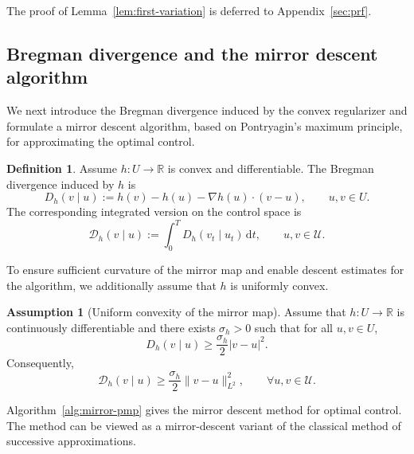 \documentclass[11pt]{amsart}
\theoremstyle{plain}
\theoremstyle{definition}
\newtheorem{defn}[theorem]{Definition}
\newtheorem{assump}{Assumption}
\theoremstyle{remark}
\newcommand{\dd}{\,\mathrm{d}}
\begin{document}
The proof of Lemma~\ref{lem:first-variation} is deferred to Appendix~\ref{sec:prf}.

\subsection{Bregman divergence and the mirror descent algorithm}\label{sec:div_alg}

We next introduce the Bregman divergence induced by the convex regularizer and formulate a mirror descent algorithm, based on Pontryagin's maximum principle, for approximating the optimal control.

\begin{defn}
Assume $h:U\to\mathbb R$ is convex and differentiable. The Bregman divergence induced by $h$ is
\begin{equation}\label{eq:bregman-pointwise}
D_h(v\mid u)
:=
h(v)-h(u)-\nabla h(u)\cdot (v-u),
\qquad u,v\in U.
\end{equation}
The corresponding integrated version on the control space is
\begin{equation}\label{eq:bregman-path}
\mathcal{D}_h(v\mid u)
:=
\int_0^T D_h(v_t\mid u_t)\dd t, \qquad u, v \in \mathcal{U}.
\end{equation}
\end{defn}

To ensure sufficient curvature of the mirror map and enable descent estimates for the algorithm, we additionally assume that $h$ is uniformly convex.

\begin{assump}[Uniform convexity of the mirror map]\label{ass:h-unif-conv}
Assume that $h:U\to \mathbb R$ is continuously differentiable and there exists $\sigma_h>0$ such that
for all $u,v\in U$,
\begin{equation}\label{eq:h-unif-conv}
D_h(v\mid u)\ge \frac{\sigma_h}{2}|v-u|^2.
\end{equation}
Consequently,
\begin{equation}\label{eq:H-unif-conv}
\mathcal{D}_h(v\mid u)\ge \frac{\sigma_h}{2}\|v-u\|_{L^2}^2,
\qquad \forall u,v\in \mathcal U.
\end{equation}
\end{assump}

Algorithm~\ref{alg:mirror-pmp} gives the mirror descent method for optimal control. The method can be viewed as a mirror-descent variant of the classical method of successive approximations.
\end{document}
